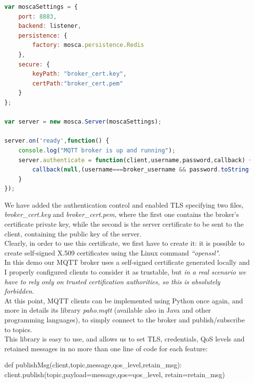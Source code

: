 \documentclass[12pt]{report}
\begin{document}
{{\begin{center}
  \lstset{%
    caption=Mosca broker security settings,
    basicstyle=\ttfamily\small\bfseries,
    frame=tb
  }
\begin{lstlisting}[language=javascript,caption=Mosca broker security settings]
var moscaSettings = {
	port: 8883,
	backend: listener,
	persistence: {
		factory: mosca.persistence.Redis
	},
	secure: {
		keyPath: "broker_cert.key",
		certPath:"broker_cert.pem"
	}
};

var server = new mosca.Server(moscaSettings);

server.on('ready',function() {
	console.log("MQTT broker is up and running");
	server.authenticate = function(client,username,password,callback) {
		callback(null,(username===broker_username && password.toString('ascii')===broker_password))
	}
});
\end{lstlisting}
\end{center}

We have added the authentication control and enabled TLS specifying two files, \emph{broker\_cert.key} and \emph{broker\_cert.pem}, where the first one contains the broker's certificate private key, while the second is the server certificate to be sent to the client, containing the public key of the server.\\
Clearly, in order to use this certificate, we first have to create it: it is possible to create self-signed X.509 certificates using the Linux command \emph{``openssl"}.\\

In this demo our MQTT broker uses a self-signed certificate generated locally and I properly configured clients to consider it as trustable, but \emph{in a real scenario we have to rely only on trusted certification authorities, so this is absolutely forbidden}.\\

At this point, MQTT clients can be implemented using Python once again, and more in details its library \emph{paho.mqtt} (available also in Java and other programming languages), to simply connect to the broker and publish/subscribe to topics.\\
This library is easy to use, and allows us to set TLS, credentials, QoS levels and retained messages in no more than one line of code for each feature:\\

\begin{python}
def publishMsg(client,topic,message,qos_level,retain_msg):
	client.publish(topic,payload=message,qos=qos_level,    					retain=retain_msg)


\end{python}}}
\end{document}
